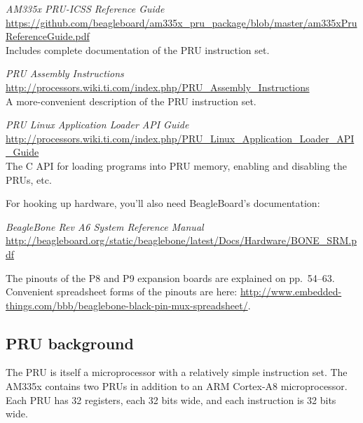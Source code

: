 \documentclass[letterpaper,11pt,fleqn]{article}
\newenvironment{docref}
   {\vspace{\baselineskip}\noindent\begin{minipage}{\textwidth}\raggedright}
   {\end{minipage}}
\begin{document}
\begin{docref}
\textit{AM335x PRU-ICSS Reference Guide} \\
\url{https://github.com/beagleboard/am335x\_pru\_package/blob/master/am335xPruReferenceGuide.pdf} \\
Includes complete documentation of the PRU instruction set.
\end{docref}

\begin{docref}
\textit{PRU Assembly Instructions} \\
\url{http://processors.wiki.ti.com/index.php/PRU\_Assembly\_Instructions} \\
A more-convenient description of the PRU instruction set.
\end{docref}

\begin{docref}
\textit{PRU Linux Application Loader API Guide} \\
\url{http://processors.wiki.ti.com/index.php/PRU\_Linux\_Application\_Loader\_API\_Guide} \\
The C API for loading programs into PRU memory, enabling and disabling the
PRUs, etc.
\end{docref}

\vspace{\baselineskip}
\noindent
For hooking up hardware, you'll also need BeagleBoard's
documentation:

\begin{docref}
\textit{BeagleBone Rev A6 System Reference Manual} \\
\url{http://beagleboard.org/static/beaglebone/latest/Docs/Hardware/BONE\_SRM.pdf}
\end{docref}

\vspace{\baselineskip}
\noindent
The pinouts of the P8 and P9 expansion boards are explained on pp.~54--63.
Convenient spreadsheet forms of the pinouts are here:
\url{http://www.embedded-things.com/bbb/beaglebone-black-pin-mux-spreadsheet/}.

\subsection{PRU background}

The PRU is itself a microprocessor with a relatively simple instruction set.
The AM335x contains two PRUs in addition to an ARM Cortex-A8 microprocessor.
Each PRU has 32 registers, each 32 bits wide, and each instruction is 32 bits
wide.
\end{document}
